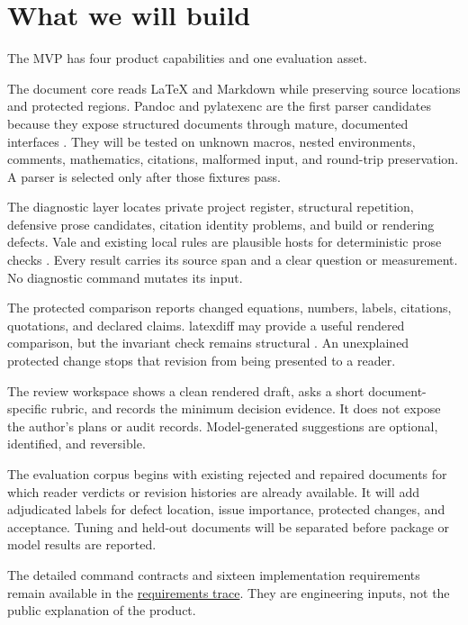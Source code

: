 \documentclass[
  11pt,
  english,
]{article}
\begin{document}
\hypertarget{what-we-will-build}{%
\section{What we will build}\label{what-we-will-build}}

The MVP has four product capabilities and one evaluation asset.

The document core reads LaTeX and Markdown while preserving source
locations and protected regions. Pandoc and pylatexenc are the first
parser candidates because they expose structured documents through
mature, documented interfaces \citep{pandoc2026filters, pylatexenc2026}.
They will be tested on unknown macros, nested environments, comments,
mathematics, citations, malformed input, and round-trip preservation. A
parser is selected only after those fixtures pass.

The diagnostic layer locates private project register, structural
repetition, defensive prose candidates, citation identity problems, and
build or rendering defects. Vale and existing local rules are plausible
hosts for deterministic prose checks \citep{vale2026docs}. Every result
carries its source span and a clear question or measurement. No
diagnostic command mutates its input.

The protected comparison reports changed equations, numbers, labels,
citations, quotations, and declared claims. latexdiff may provide a
useful rendered comparison, but the invariant check remains structural
\citep{latexdiff2026}. An unexplained protected change stops that
revision from being presented to a reader.

The review workspace shows a clean rendered draft, asks a short
document- specific rubric, and records the minimum decision evidence. It
does not expose the author's plans or audit records. Model-generated
suggestions are optional, identified, and reversible.

The evaluation corpus begins with existing rejected and repaired
documents for which reader verdicts or revision histories are already
available. It will add adjudicated labels for defect location, issue
importance, protected changes, and acceptance. Tuning and held-out
documents will be separated before package or model results are
reported.

The detailed command contracts and sixteen implementation requirements
remain available in the
\href{humanvoice_product_requirements.csv}{requirements trace}. They are
engineering inputs, not the public explanation of the product.
\end{document}
